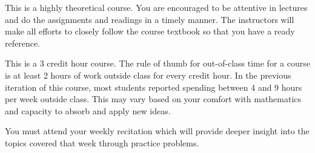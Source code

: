 \documentclass[a4paper]{article}
\begin{document}
This is a highly theoretical course. You are encouraged to be attentive in lectures and do the assignments and readings in a timely manner. The instructors will make all efforts to closely follow the course textbook so that you have a ready reference. 

This is a 3 credit hour course. The rule of thumb for out-of-class time for a course is at least 2 hours of work outside class for every credit hour. In the previous iteration of this course, most students reported spending between 4 and 9 hours per week outside class. This may vary based on your comfort with mathematics and capacity to absorb and apply new ideas.

You must attend your weekly recitation which will provide deeper insight into the topics covered that week through practice problems.
\end{document}
